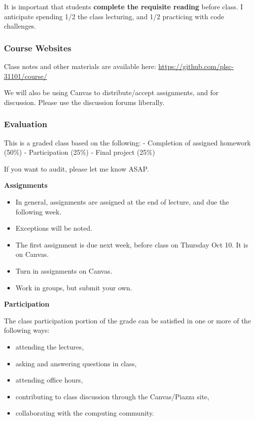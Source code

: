 \documentclass[]{book}
\providecommand{\tightlist}{%
  \setlength{\itemsep}{0pt}\setlength{\parskip}{0pt}}
\begin{document}
It is important that students \textbf{complete the requisite reading} before class. I anticipate spending 1/2 the class lecturing, and 1/2 practicing with code challenges.

\hypertarget{course-websites}{%
\subsubsection*{Course Websites}\label{course-websites}}

Class notes and other materials are available here:
\url{https://github.com/plsc-31101/course/}

We will also be using Canvas to distribute/accept assignments, and for discussion. Please use the discussion forums liberally.

\hypertarget{evaluation}{%
\subsubsection*{Evaluation}\label{evaluation}}

This is a graded class based on the following:
- Completion of assigned homework (50\%)
- Participation (25\%)
- Final project (25\%)

If you want to audit, please let me know ASAP.

\textbf{Assignments}

\begin{itemize}
\tightlist
\item
  In general, assignments are assigned at the end of lecture, and due the following week.
\item
  Exceptions will be noted.
\item
  The first assignment is due next week, before class on Thursday Oct 10. It is on Canvas.
\item
  Turn in assignments on Canvas.
\item
  Work in groups, but submit your own.
\end{itemize}

\textbf{Participation}

The class participation portion of the grade can be satisfied in one or more of the following ways:

\begin{itemize}
\tightlist
\item
  attending the lectures,
\item
  asking and answering questions in class,
\item
  attending office hours,
\item
  contributing to class discussion through the Canvas/Piazza site,
\item
  collaborating with the computing community.
\end{itemize}
\end{document}

